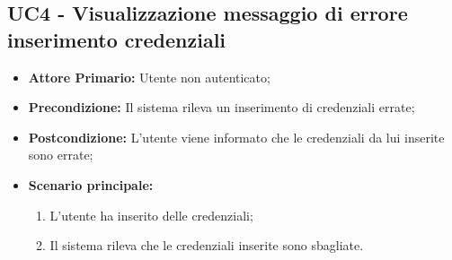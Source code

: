 \subsection{UC4 - Visualizzazione messaggio di errore inserimento credenziali}
\begin{itemize}
\item \textbf{Attore Primario:} Utente non autenticato;
\item \textbf{Precondizione:} Il sistema rileva un inserimento di credenziali errate;
\item \textbf{Postcondizione:} L'utente viene informato che le credenziali da lui inserite sono errate;
\item \textbf{Scenario principale:}
    \begin{enumerate}
    \item L'utente ha inserito delle credenziali;
    \item Il sistema rileva che le credenziali inserite sono sbagliate.
    \end{enumerate}
\end{itemize}